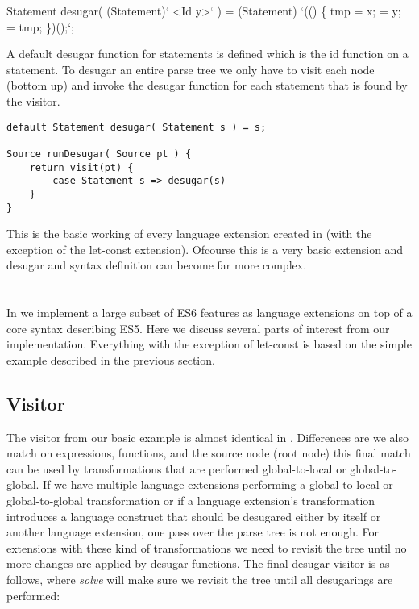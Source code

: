 
\begin{rascal}
Statement desugar( (Statement)`   {\textless{}Id y\textgreater{}}` )
    = (Statement)
            `(() \{{}
            	 tmp = x;
            	 = y;
            	 = tmp;
            \}{})();`;
\end{rascal}

A default desugar function for statements is defined which is the id function on a statement. To desugar an entire parse tree we only have to visit each node (bottom up) and invoke the desugar function for each statement that is found by the visitor.

\begin{lstlisting}[caption=Desugar visitor, language=rascal]
default Statement desugar( Statement s ) = s;

Source runDesugar( Source pt ) {
	return visit(pt) {
		case Statement s => desugar(s)
	}
}
\end{lstlisting}

This is the basic working of every language extension created in \textit{\projectname} (with the exception of the let-const extension). Ofcourse this is a very basic extension and desugar and syntax definition can become far more complex.

\section{\projectname}
In \textit{\projectname} we implement a large subset of ES6 features as language extensions on top of a core syntax describing ES5. Here we discuss several parts of interest from our implementation. Everything with the exception of let-const is based on the simple example described in the previous section. 

\subsection{Visitor}
The visitor from our basic example is almost identical in \projectname. Differences are we also match on expressions, functions, and the source node (root node) this final match can be used by transformations that are performed global-to-local or global-to-global. If we have multiple language extensions performing a global-to-local or global-to-global transformation or if a language extension's transformation introduces a language construct that should be desugared either by itself or another language extension, one pass over the parse tree is not enough. For extensions with these kind of transformations we need to revisit the tree until no more changes are applied by desugar functions. The final desugar visitor is as follows, where \textit{solve} will make sure we revisit the tree until all desugarings are performed:

